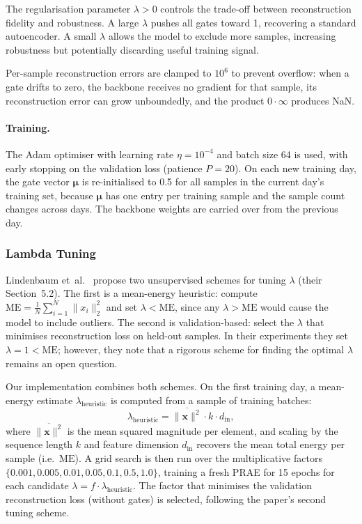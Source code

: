 \documentclass[11pt]{report}
\begin{document}
The regularisation parameter $\lambda > 0$ controls the trade-off between reconstruction fidelity and robustness. A large $\lambda$ pushes all gates toward 1, recovering a standard autoencoder. A small $\lambda$ allows the model to exclude more samples, increasing robustness but potentially discarding useful training signal.

Per-sample reconstruction errors are clamped to $10^6$ to prevent overflow: when a gate drifts to zero, the backbone receives no gradient for that sample, its reconstruction error can grow unboundedly, and the product $0 \cdot \infty$ produces NaN.

\paragraph{Training.}
The Adam optimiser with learning rate $\eta = 10^{-4}$ and batch size 64 is used, with early stopping on the validation loss (patience $P = 20$). On each new training day, the gate vector $\boldsymbol{\mu}$ is re-initialised to 0.5 for all samples in the current day's training set, because $\boldsymbol{\mu}$ has one entry per training sample and the sample count changes across days. The backbone weights are carried over from the previous day.

\subsubsection{Lambda Tuning}\label{subsubsec:models:lambda}

Lindenbaum et~al.~\cite{lindenbaum2022prae} propose two unsupervised schemes for tuning $\lambda$ (their Section~5.2).
The first is a mean-energy heuristic: compute $\mathrm{ME} = \frac{1}{N}\sum_{i=1}^{N}\|x_i\|_2^2$ and set $\lambda < \mathrm{ME}$, since any $\lambda > \mathrm{ME}$ would cause the model to include outliers.
The second is validation-based: select the $\lambda$ that minimises reconstruction loss on held-out samples.
In their experiments they set $\lambda = 1 < \mathrm{ME}$; however, they note that a rigorous scheme for finding the optimal $\lambda$ remains an open question.

Our implementation combines both schemes. On the first training day, a mean-energy estimate $\lambda_{\text{heuristic}}$ is computed from a sample of training batches:
\begin{equation}
  \label{eq:lambda_heuristic}
  \lambda_{\text{heuristic}} = \overline{\|\mathbf{x}\|^2} \cdot k \cdot d_{\text{in}},
\end{equation}
where $\overline{\|\mathbf{x}\|^2}$ is the mean squared magnitude per element, and scaling by the sequence length $k$ and feature dimension $d_{\text{in}}$ recovers the mean total energy per sample (i.e.\ $\mathrm{ME}$). A grid search is then run over the multiplicative factors $\{0.001, 0.005, 0.01, 0.05, 0.1, 0.5, 1.0\}$, training a fresh PRAE for 15 epochs for each candidate $\lambda = f \cdot \lambda_{\text{heuristic}}$. The factor that minimises the validation reconstruction loss (without gates) is selected, following the paper's second tuning scheme.
\end{document}
